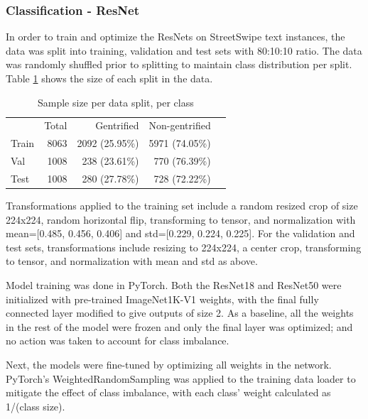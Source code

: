 \subsubsection{Classification - ResNet}

In order to train and optimize the ResNets on StreetSwipe text instances, the data was split into training, validation and test sets with 80:10:10 ratio. The data was randomly shuffled prior to splitting to maintain class distribution per split. Table \ref{tab:data_split} shows the size of each split in the data.

\begin{table}[]
    \begin{tabular}{lrrrl}
    \cline{1-4}
            & \multicolumn{1}{r}{Total} &\multicolumn{1}{r}{Gentrified} & \multicolumn{1}{r}{Non-gentrified} &  \\ \cline{1-4}
Train       & 8063                      & 2092 (25.95\%)                & 5971 (74.05\%)           &  \\
Val         & 1008                      & 238 (23.61\%)                 & 770 (76.39\%)            &  \\
Test        & 1008                      & 280 (27.78\%)                 & 728 (72.22\%)            & 
    \end{tabular}
    \caption{Sample size per data split, per class}
    \label{tab:data_split}
\end{table}

Transformations applied to the training set include a random resized crop of size 224x224, random horizontal flip, transforming to tensor, and normalization with mean=[0.485, 0.456, 0.406] and std=[0.229, 0.224, 0.225]. For the validation and test sets, transformations include resizing to 224x224, a center crop, transforming to tensor, and normalization with mean and std as above.

Model training was done in PyTorch. Both the ResNet18 and ResNet50 were initialized with pre-trained ImageNet1K-V1 weights, with the final fully connected layer modified to give outputs of size 2. As a baseline, all the weights in the rest of the model were frozen and only the final layer was optimized; and no action was taken to account for class imbalance.

Next, the models were fine-tuned by optimizing all weights in the network. PyTorch's WeightedRandomSampling was applied to the training data loader to mitigate the effect of class imbalance, with each class' weight calculated as 1/(class size).

